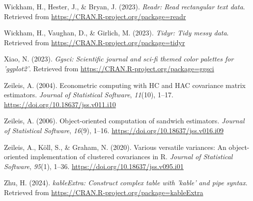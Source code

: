 \documentclass[
  man,floatsintext]{apa6}
\newlength{\cslhangindent}
\newlength{\cslentryspacingunit} %
\newenvironment{CSLReferences}[2] %
 {%
  \setlength{\parindent}{0pt}
  \ifodd #1
  \let\oldpar\par
  \def\par{\hangindent=\cslhangindent\oldpar}
  \fi
  \setlength{\parskip}{#2\cslentryspacingunit}
 }%
 {}
\begin{document}
\begin{CSLReferences}{1}{0}
\leavevmode{}%
Wickham, H., Hester, J., \& Bryan, J. (2023). \emph{Readr: Read rectangular text data}. Retrieved from \url{https://CRAN.R-project.org/package=readr}

\leavevmode{}%
Wickham, H., Vaughan, D., \& Girlich, M. (2023). \emph{Tidyr: Tidy messy data}. Retrieved from \url{https://CRAN.R-project.org/package=tidyr}

\leavevmode{}%
Xiao, N. (2023). \emph{Ggsci: Scientific journal and sci-fi themed color palettes for 'ggplot2'}. Retrieved from \url{https://CRAN.R-project.org/package=ggsci}

\leavevmode{}%
Zeileis, A. (2004). Econometric computing with {HC} and {HAC} covariance matrix estimators. \emph{Journal of Statistical Software}, \emph{11}(10), 1--17. \url{https://doi.org/10.18637/jss.v011.i10}

\leavevmode{}%
Zeileis, A. (2006). Object-oriented computation of sandwich estimators. \emph{Journal of Statistical Software}, \emph{16}(9), 1--16. \url{https://doi.org/10.18637/jss.v016.i09}

\leavevmode{}%
Zeileis, A., Köll, S., \& Graham, N. (2020). Various versatile variances: An object-oriented implementation of clustered covariances in {R}. \emph{Journal of Statistical Software}, \emph{95}(1), 1--36. \url{https://doi.org/10.18637/jss.v095.i01}

\leavevmode{}%
Zhu, H. (2024). \emph{kableExtra: Construct complex table with 'kable' and pipe syntax}. Retrieved from \url{https://CRAN.R-project.org/package=kableExtra}

\end{CSLReferences}
\end{document}
